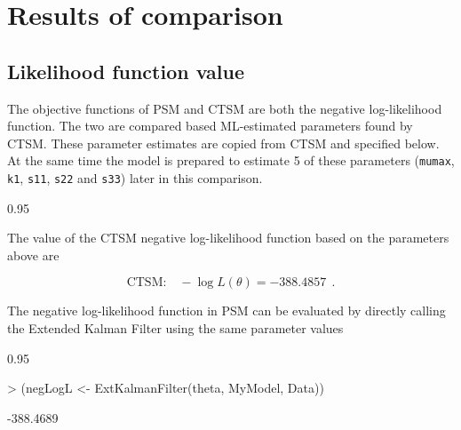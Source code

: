 \documentclass{article}
\renewenvironment{Schunk}
{\begin{center} \begin{boxedminipage}{0.95\textwidth} }
{\end{boxedminipage}\end{center}}
\begin{document}
\section{Results of comparison}

\subsection{Likelihood function value}

The objective functions of PSM and CTSM are both the negative
log-likelihood function. The two are compared based ML-estimated
parameters found by CTSM. These parameter estimates are copied from
CTSM and specified below. At the same time the model is prepared to
estimate 5 of these parameters (\verb|mumax|, \verb|k1|, \verb|s11|,
\verb|s22| and \verb|s33|) later in this comparison.

\begin{Schunk}
\end{Schunk}

The value of the CTSM negative log-likelihood function based on the
parameters above are 

\begin{equation}
  \text{CTSM:} \quad -\log L (\theta)= -388.4857 ~~.
  \label{ctsmL}
\end{equation}

The negative log-likelihood function in PSM can be evaluated by
directly calling the Extended Kalman Filter using the same
parameter values

\begin{Schunk}
\begin{Sinput}
> (negLogL <- ExtKalmanFilter(theta, MyModel, Data))
\end{Sinput}
\begin{Soutput}
[1] -388.4689
\end{Soutput}
\end{Schunk}
\end{document}
